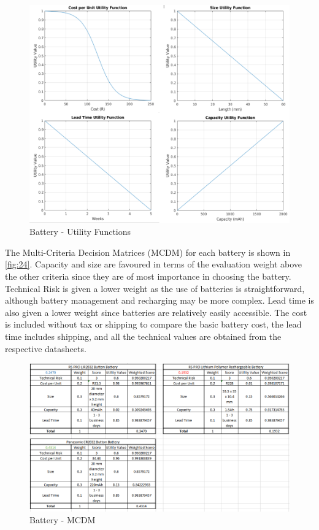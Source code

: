\begin{figure}[H]
	\centering
	\includegraphics[scale=0.4]{img/B-Util}
	\caption{Battery - Utility Functions}
	\label{fig:23}
\end{figure}
\noindent
The Multi-Criteria Decision Matrices (MCDM) for each battery is shown in \autoref{fig:24}. Capacity and size are favoured in terms of the evaluation weight above the other criteria since they are of most importance in choosing the battery. Technical Risk is given a lower weight as the use of batteries is straightforward, although battery management and recharging may be more complex. Lead time is also given a lower weight since batteries are relatively easily accessible. The cost is included without tax or shipping to compare the basic battery cost, the lead time includes shipping, and all the technical values are obtained from the respective datasheets.
\begin{figure}[H]
	\centering
	\includegraphics[scale=0.55]{img/B-MCDM}
	\caption{Battery - MCDM}
	\label{fig:24}
\end{figure}
